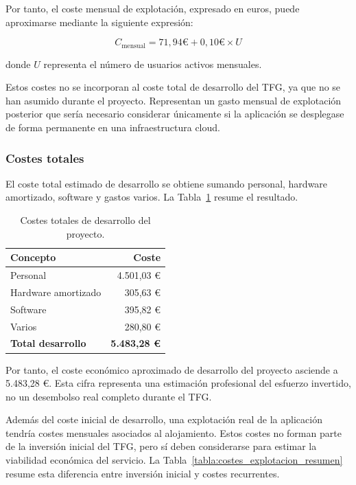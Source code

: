 Por tanto, el coste mensual de explotación, expresado en euros, puede aproximarse mediante la siguiente expresión:

\[
C_{\text{mensual}} = 71,94\text{€} + 0,10\text{€} \times U
\]

donde \(U\) representa el número de usuarios activos mensuales.

Estos costes no se incorporan al coste total de desarrollo del TFG, ya que no se han asumido durante el proyecto. Representan un gasto mensual de explotación posterior que sería necesario considerar únicamente si la aplicación se desplegase de forma permanente en una infraestructura cloud.

\subsubsection{Costes totales}

El coste total estimado de desarrollo se obtiene sumando personal, hardware amortizado, software y gastos varios. La Tabla~\ref{tabla:costes_totales} resume el resultado.

\begin{table}[H]
	\centering
	\begin{tabular}{@{}lr@{}}
		\toprule
		\textbf{Concepto} & \textbf{Coste} \\
		\midrule
		Personal & 4.501,03 € \\
		Hardware amortizado & 305,63 € \\
		Software & 395,82 € \\
		Varios & 280,80 € \\
		\midrule
		\textbf{Total desarrollo} & \textbf{5.483,28 €} \\
		\bottomrule
	\end{tabular}
	\caption{Costes totales de desarrollo del proyecto.}
	\label{tabla:costes_totales}
\end{table}

Por tanto, el coste económico aproximado de desarrollo del proyecto asciende a 5.483,28 €. Esta cifra representa una estimación profesional del esfuerzo invertido, no un desembolso real completo durante el TFG.

Además del coste inicial de desarrollo, una explotación real de la aplicación tendría costes mensuales asociados al alojamiento. Estos costes no forman parte de la inversión inicial del TFG, pero sí deben considerarse para estimar la viabilidad económica del servicio. La Tabla~\ref{tabla:costes_explotacion_resumen} resume esta diferencia entre inversión inicial y costes recurrentes.

